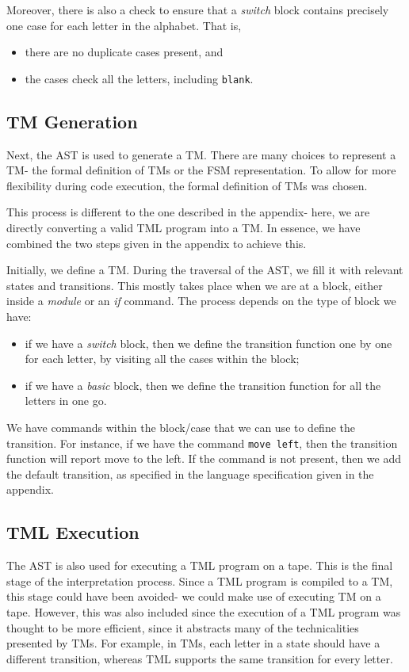 Moreover, there is also a check to ensure that a \textit{switch} block contains precisely one case for each letter in the alphabet. That is,
\begin{itemize}
    \item there are no duplicate cases present, and 
    \item the cases check all the letters, including \texttt{blank}.
\end{itemize}

\subsection{TM Generation}
Next, the AST is used to generate a TM. There are many choices to represent a TM- the formal definition of TMs or the FSM representation. To allow for more flexibility during code execution, the formal definition of TMs was chosen. 

This process is different to the one described in the appendix- here, we are directly converting a valid TML program into a TM. In essence, we have combined the two steps given in the appendix to achieve this.

Initially, we define a TM. During the traversal of the AST, we fill it with relevant states and transitions. This mostly takes place when we are at a block, either inside a \textit{module} or an \textit{if} command. The process depends on the type of block we have:
\begin{itemize}
    \item if we have a \textit{switch} block, then we define the transition function one by one for each letter, by visiting all the cases within the block;
    \item if we have a \textit{basic} block, then we define the transition function for all the letters in one go.
\end{itemize}
We have commands within the block/case that we can use to define the transition. For instance, if we have the command \texttt{move left}, then the transition function will report move to the left. If the command is not present, then we add the default transition, as specified in the language specification given in the appendix.

\subsection{TML Execution}

The AST is also used for executing a TML program on a tape. This is the final stage of the interpretation process. Since a TML program is compiled to a TM, this stage could have been avoided- we could make use of executing TM on a tape. However, this was also included since the execution of a TML program was thought to be more efficient, since it abstracts many of the technicalities presented by TMs. For example, in TMs, each letter in a state should have a different transition, whereas TML supports the same transition for every letter.

